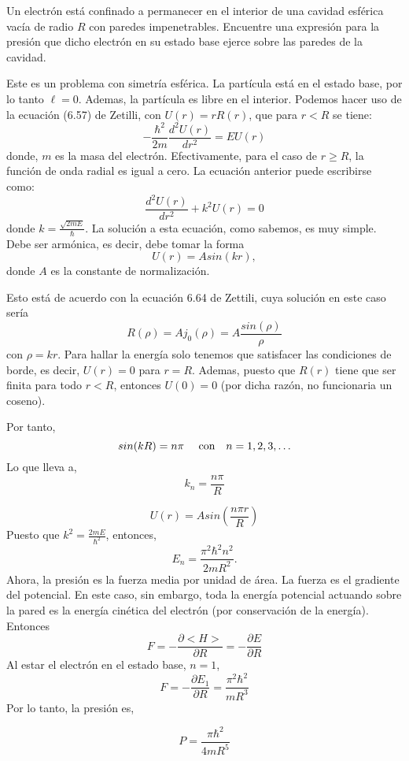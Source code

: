 \question [20]

Un electrón está confinado a permanecer en el interior de una cavidad esférica vacía de radio $R$ con paredes impenetrables. Encuentre una expresión para la presión que dicho electrón en su estado base ejerce sobre las paredes de la cavidad.
\begin{solution}
Este es un problema con simetría esférica. La partícula está en el estado base, por lo tanto $\ell =0$. Ademas, la partícula es libre en el interior.
Podemos hacer uso de la ecuación (6.57) de Zetilli, con $U(r)=rR(r)$, que para $r<R$ se tiene:
\begin{equation}
-\frac{\hbar^2}{2m}\frac{d^2 U(r)}{dr^2}=E U(r)
\end{equation} 
donde, $m$ es la masa del electrón. Efectivamente, para el caso de $r \geq R$, la función de onda radial es igual a cero. La ecuación anterior puede escribirse como:
\begin{equation}
\frac{d^2 U(r)}{dr^2}+k^2U(r)=0
\end{equation}
donde $k=\frac{\sqrt{2mE}}{\hbar}$. La solución a esta ecuación, como sabemos, es muy simple. Debe ser armónica, es decir, debe tomar la forma
\begin{equation}
U(r)=Asin(kr),
\end{equation}
donde $A$ es la constante de normalización.

Esto está de acuerdo con la ecuación 6.64 de Zettili, cuya solución en este caso sería
\begin{equation}
R(\rho) =Aj_0 (\rho)=A\frac{sin(\rho)}{\rho}
\end{equation}
con $\rho=kr$. Para hallar la energía solo tenemos que satisfacer las condiciones de borde, es decir, $U(r)=0$ para $r=R$. Ademas, puesto que $R(r)$ tiene que ser finita para todo  $r<R$, entonces $U(0)=0$ (por dicha razón, no funcionaria un coseno).

Por tanto, 
\begin{equation}
sin(kR)=n\pi  \ \ \ \ \text{con} \quad n=1,2,3, \ldots \notag
\end{equation}
Lo que lleva  a,
\begin{equation}
k_n=\frac{n\pi}{R}
\end{equation}

$$U(r)=Asin (\frac{n\pi r}{R}) $$
Puesto que $k^2=\frac{2mE}{\hbar^2}$, entonces,
\begin{equation}
E_n=\frac{\pi^2\hbar^2n^2}{2mR^2}.
\end{equation}
Ahora, la presión es la fuerza media por unidad de área. La fuerza es el gradiente del potencial. En este caso, sin embargo, toda la energía potencial actuando sobre la pared es la energía cinética del electrón (por conservación de la energía). Entonces
\begin{equation}
F=-\frac{\partial <H>}{\partial R}=-\frac{\partial E}{\partial R}
\end{equation}
Al estar el electrón en el estado base, $n=1$,
\begin{equation}
F=- \frac{\partial E_1}{\partial R}=\frac{\pi^2 \hbar^2}{mR^3}
\end{equation}
Por lo tanto, la presión es,

\begin{equation}
P=\frac{\pi\hbar^2}{4mR^5}
\end{equation}
\end{solution}

